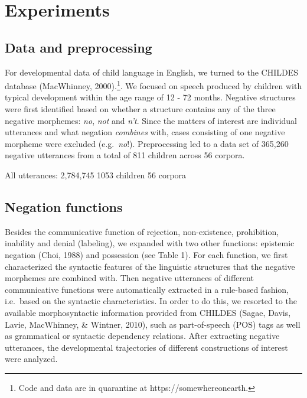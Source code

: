 \documentclass[
  english,
  man,floatsintext]{apa6}
\begin{document}
\newpage

\hypertarget{experiments}{%
\section{Experiments}\label{experiments}}

\hypertarget{data-and-preprocessing}{%
\subsection{Data and preprocessing}\label{data-and-preprocessing}}

For developmental data of child language in English, we turned to the CHILDES database (MacWhinney, 2000).\footnote{Code and data are in quarantine at https://somewhereonearth.}. We focused on speech produced by children with typical development within the age range of 12 - 72 months. Negative structures were first identified based on whether a structure contains any of the three negative morphemes: \emph{no}, \emph{not} and \emph{n't}. Since the matters of interest are individual utterances and what negation \emph{combines} with, cases consisting of one negative morpheme were excluded (e.g.~\emph{no}!). Preprocessing led to a data set of 365,260 negative utterances from a total of 811 children across 56 corpora.

All utterances:
2,784,745
1053 children
56 corpora

\hypertarget{negation-functions}{%
\subsection{Negation functions}\label{negation-functions}}

Besides the communicative function of rejection, non-existence, prohibition, inability and denial (labeling), we expanded with two other functions: epistemic negation (Choi, 1988) and possession (see Table 1). For each function, we first characterized the syntactic features of the linguistic structures that the negative morphemes are combined with. Then negative utterances of different communicative functions were automatically extracted in a rule-based fashion, i.e.~based on the syntactic characteristics. In order to do this, we resorted to the available morphosyntactic information provided from CHILDES (Sagae, Davis, Lavie, MacWhinney, \& Wintner, 2010), such as part-of-speech (POS) tags as well as grammatical or syntactic dependency relations. After extracting negative utterances, the developmental trajectories of different constructions of interest were analyzed.
\end{document}
